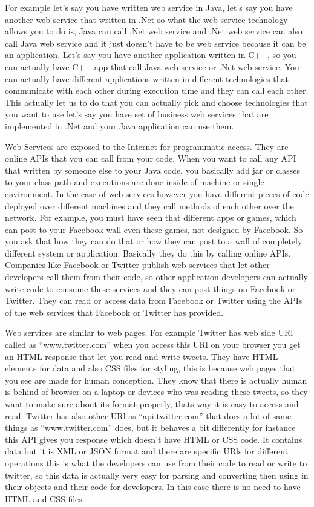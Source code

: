 For example let’s say you have written web service in Java, let’s say you have another web service that written in .Net so what the web service technology allows you to do is, Java can call .Net web service and .Net web service can also call Java web service and it just doesn’t have to be web service because it can be an application. Let’s say you have another application written in C++, so you can actually have C++ app that call Java web service or .Net web service. You can actually have different applications written in different
technologies that communicate with each other during execution time and they can call each other. This actually let us to do that you can actually pick and choose technologies that you want to use let’s say you have set of business web services that are implemented in .Net and your Java application can use them.

Web Services are exposed to the Internet for programmatic access. They are online APIs that you can call from your code. When you want to call any API that written by someone else to your Java code, you basically add jar or classes to your class path and executions are done inside of machine or single environment. In the case of web services however you have different pieces of code deployed over different machines and they call methods of each other over the network. For example, you must have seen that different apps or games, which can post to your Facebook wall even these games, not designed by Facebook. So you ask that how they can do that or how they can post to a wall of completely different system or application. Basically they do this by calling online APIs. Companies like Facebook or Twitter publish web services that let other developers call them from their code, so other application developers can actually write code to consume these services and they can post things on Facebook or Twitter. They can read or access data from Facebook or Twitter using the APIs of the web services that Facebook or Twitter has provided.

Web services are similar to web pages. For example Twitter has web side URl called as “www.twitter.com”  when you access this URl on your browser you get an HTML response that let you read and write tweets. They have HTML elements for data and also CSS files for styling, this is because web pages that you see are made for human conception. They know that there is actually human is behind of browser on a laptop or devices who was reading these tweets, so they want to make sure about its format properly, thats way it is easy to access and read. Twitter has also other URl as “api.twitter.com” that does a lot of same things as “www.twitter.com” does, but it behaves a bit differently for instance this API gives you response which doesn’t have HTML or CSS code. It contains data but it is XML or JSON format and there are specific URls for different operations this is what the developers can use from their code to read or write to twitter, so this data is actually very easy for parsing and converting then using in their objects and their code for developers. In this case there is no need to have HTML and CSS files.

